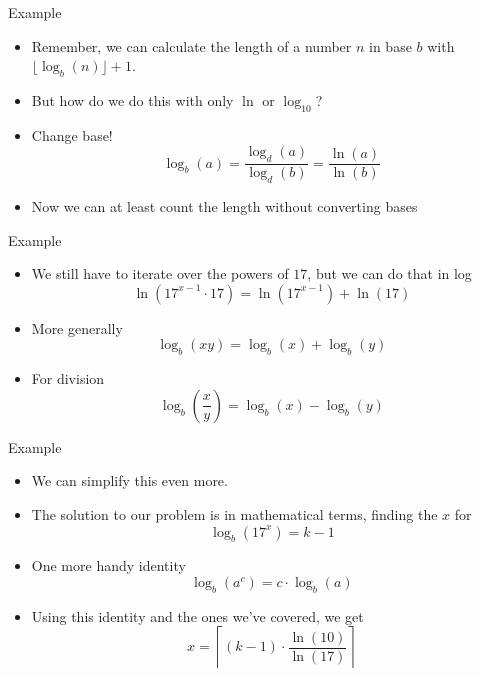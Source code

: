 \documentclass[12pt,t]{beamer}
\newcommand{\bi}{\begin{itemize}}
\newcommand{\ei}{\end{itemize}}
\begin{document}
\begin{frame}[fragile]{Example}
  \vspace{40pt}
  \bi
    \item Remember, we can calculate the length of a number $n$ in base $b$
      with $\lfloor \log_b(n) \rfloor + 1$.
    \item But how do we do this with only $\ln$ or $\log_{10}$?
    \item Change base!
      \[
        \log_b(a) = \frac{\log_d(a)}{\log_d(b)} = \frac{\ln(a)}{\ln(b)}
      \]
    \item Now we can at least count the length without converting bases
  \ei
\end{frame}

\begin{frame}{Example}
  \vspace{20pt}
  \bi
    \item We still have to iterate over the powers of $17$, but we can do that in log
      \[
        \ln(17^{x-1} \cdot 17) = \ln(17^{x-1}) + \ln(17)
      \]
    \item More generally
      \[
        \log_b(xy) = \log_b(x) + \log_b(y)
      \]
    \item For division
      \[
        \log_b(\frac{x}{y}) = \log_b(x) - \log_b(y)
      \]
  \ei
\end{frame}

\begin{frame}{Example}
  \vspace{20pt}
  \bi
    \item We can simplify this even more.
    \item The solution to our problem is in mathematical terms, finding the $x$ for
      \[
        \log_b(17^x) = k - 1
      \]
    \item One more handy identity
      \[
        \log_b(a^c) = c \cdot \log_b(a)
      \]
    \item Using this identity and the ones we've covered, we get
      \[
        x = \left\lceil (k-1) \cdot \frac{\ln(10)}{\ln(17)} \right\rceil
      \]
  \ei
\end{frame}
\end{document}
